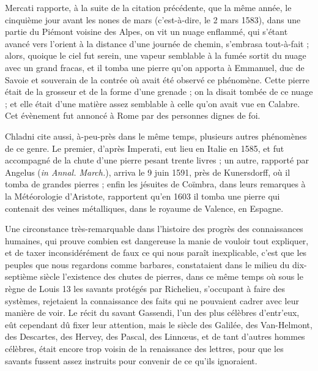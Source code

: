 \documentclass[a4paper, 12pt, oneside, french]{article}
\begin{document}
Mercati rapporte, à la suite de la citation précédente, que la même année, le cinquième jour avant les nones de mars (c'est-à-dire, le 2 mars 1583), dans une partie du Piémont voisine des Alpes, on vit un nuage enflammé, qui s'étant avancé vers l'orient à la distance d'une journée de chemin, s'embrasa tout-à-fait ; alors, quoique le ciel fut serein, une vapeur semblable à la fumée sortit du nuage avec un grand fracas, et il tomba une pierre qu'on apporta à Emmanuel, duc de Savoie et souverain de la contrée où avait été observé ce phénomène. Cette pierre était de la grosseur et de la forme d'une grenade ; on la disait tombée de ce nuage ; et elle était d'une matière assez semblable à celle qu'on avait vue en Calabre. Cet évènement fut annoncé à Rome par des personnes dignes de foi.

Chladni cite aussi, à-peu-près dans le même temps, plusieurs autres phénomènes de ce genre. Le premier, d'après Imperati, eut lieu en Italie en 1585, et fut accompagné de la chute d'une pierre pesant trente livres ; un autre, rapporté par Angelus (\emph{in Annal. March.}), arriva le 9 juin 1591, près de Kunersdorff, où il tomba de grandes pierres ; enfin les jésuites de Coïmbra, dans leurs remarques à la Météorologie d'Aristote, rapportent qu'en 1603 il tomba une pierre qui contenait des veines métalliques, dans le royaume de Valence, en Espagne.

Une circonstance très-remarquable dans l'histoire des progrès des connaissances humaines, qui prouve combien est dangereuse la manie de vouloir tout expliquer, et de taxer inconsidérément de faux ce qui nous paraît inexplicable, c'est que les peuples que nous regardons comme barbares, constataient dans le milieu du dix-septième siècle l'existence des chutes de pierres, dans ce même temps où sous le règne de Louis 13 les savants protégés par Richelieu, s'occupant à faire des systèmes, rejetaient la connaissance des faits qui ne pouvaient cadrer avec leur manière de voir. Le récit du savant Gassendi, l'un des plus célèbres d'entr'eux, eût cependant dû fixer leur attention, mais le siècle des Galilée, des Van-Helmont, des Descartes, des Hervey, des Pascal, des Linnœus, et de tant d'autres hommes célèbres, était encore trop voisin de la renaissance des lettres, pour que les savants fussent assez instruits pour convenir de ce qu'ils ignoraient.
\end{document}
